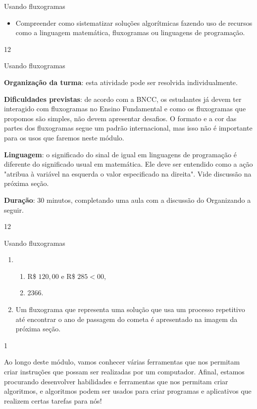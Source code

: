 \label{comp-exp2}
\clearmargin
\begin{objectives}{Usando fluxogramas}
{
\begin{itemize}
\item Compreender como sistematizar soluções algorítmicas fazendo uso de recursos como a linguagem matemática, fluxogramas ou linguagens de programação.
\end{itemize}
}{1}{2}
\end{objectives}
\begin{sugestions}{Usando fluxogramas}
{
\textbf{Organização da turma}: esta atividade pode ser resolvida individualmente.

\textbf{Dificuldades previstas}: de acordo com a BNCC, os estudantes já devem ter interagido com fluxogramas no Ensino Fundamental e como os fluxogramas que propomos são simples, não devem apresentar desafios. O formato e a cor das partes dos fluxogramas segue um padrão internacional, mas isso não é importante para os usos que faremos neste módulo.

\textbf{Linguagem}: o significado do sinal de igual em linguagens de programação é diferente do significado usual em matemática. Ele deve ser entendido como a ação "atribua à variável na esquerda o valor especificado na direita". Vide discussão na próxima seção.

\textbf{Duração}: 30 minutos, completando uma aula com a discussão do Organizando a seguir.
}{1}{2}
\end{sugestions}
\begin{answer}{Usando fluxogramas}
{
\begin{enumerate}
\item 
\begin{enumerate}
\item R\$ $120{,}00$ e R\$ $285<00$, 
\item 2366.
\end{enumerate}

\item Um fluxograma que representa uma solução que usa um processo repetitivo até encontrar o ano de passagem do cometa é apresentado na imagem da próxima seção.
\end{enumerate}
}{1}
\end{answer}

Ao longo deste módulo, vamos conhecer várias ferramentas que nos permitam criar instruções que possam ser realizadas por um computador. Afinal, estamos procurando desenvolver habilidades e ferramentas que nos permitam criar algoritmos, e algoritmos podem ser usados para criar programas e aplicativos que realizem certas tarefas para nós!

